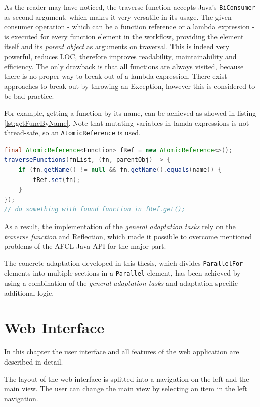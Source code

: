 \documentclass[a4paper,12pt,pdftex,halfparskip,cleardoubleempty,bibtotoc,liststotoc]{scrbook}
\begin{document}
As the reader may have noticed, the traverse function accepts Java's \texttt{BiConsumer} as second argument, which makes it very versatile in its usage. The given consumer operation - which can be a function reference or a lambda expression - is executed for every function element in the workflow, providing the element itself and its \textit{parent object} as arguments on traversal. This is indeed very powerful, reduces LOC, therefore improves readability, maintainability and efficiency. The only drawback is that all functions are always visited, because there is no proper way to break out of a lambda expression. There exist approaches to break out by throwing an Exception, however this is considered to be bad practice.

For example, getting a function by its name, can be achieved as showed in listing \ref{lst:getFuncByName}. \small Note that mutating variables in lamda expressions is not thread-safe, so an \texttt{AtomicReference} is used.

\begin{lstlisting}[language=Java,caption={get a function by its name},label=lst:getFuncByName]
final AtomicReference<Function> fRef = new AtomicReference<>();
traverseFunctions(fnList, (fn, parentObj) -> {
    if (fn.getName() != null && fn.getName().equals(name)) {
        fRef.set(fn);
    }
});
// do something with found function in fRef.get();
\end{lstlisting}

As a result, the implementation of the \textit{general adaptation tasks} rely on the \textit{traverse function} and Reflection, which made it possible to overcome mentioned problems of the AFCL Java API for the major part.

The concrete adaptation developed in this thesis, which divides \texttt{ParallelFor} elements into multiple sections in a \texttt{Parallel} element, has been achieved by using a combination of the \textit{general adaptation tasks} and adaptation-specific additional logic.


\chapter{Web Interface}
\label{chap:impl-webinterface}

In this chapter the user interface and all features of the web application are described in detail.

The layout of the web interface is splitted into a navigation on the left and the main view. The user can change the main view by selecting an item in the left navigation.
\end{document}
